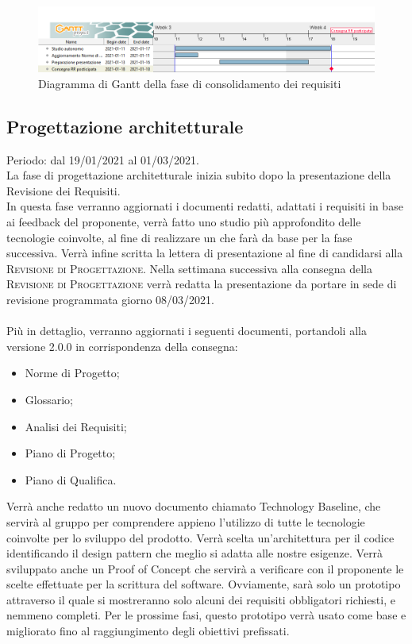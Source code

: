 \documentclass[../piano_di_progetto.tex]{subfiles}
\begin{document}
\begin{figure}[H]
\centering
\includegraphics[width=18cm]{img/gantt/01_RR_consolidamento.png}
\caption{ Diagramma di Gantt della fase di consolidamento dei requisiti}
\end{figure}

\subsection{Progettazione architetturale}%
\label{sub:prog_arc}
Periodo: dal 19/01/2021 al 01/03/2021.\\
La fase di progettazione architetturale inizia subito dopo la presentazione della Revisione dei Requisiti.\\
In questa fase verranno aggiornati i documenti redatti, adattati i requisiti in base ai feedback del proponente, verrà fatto uno studio più approfondito delle tecnologie coinvolte, al fine di realizzare un  che farà da base per la fase successiva. Verrà infine scritta la lettera di presentazione al fine di candidarsi alla \textsc{Revisione di Progettazione}. Nella settimana successiva alla consegna della \textsc{Revisione di Progettazione} verrà redatta la presentazione da portare in sede di revisione programmata giorno 08/03/2021. \\ \\

Più in dettaglio, verranno aggiornati i seguenti documenti, portandoli alla versione 2.0.0 in corrispondenza della consegna:

\begin{itemize}
    \item Norme di Progetto;
    \item Glossario;
    \item Analisi dei Requisiti;
    \item Piano di Progetto;
    \item Piano di Qualifica.
\end{itemize}

Verrà anche redatto un nuovo documento chiamato Technology Baseline, che servirà al gruppo per comprendere appieno l'utilizzo di tutte le tecnologie coinvolte per lo sviluppo del prodotto. Verrà scelta un'architettura per il codice identificando il design pattern che meglio si adatta alle nostre esigenze. Verrà sviluppato anche un Proof of Concept che servirà a verificare con il proponente le scelte effettuate per la scrittura del software. Ovviamente, sarà solo un prototipo attraverso il quale si mostreranno solo alcuni dei requisiti obbligatori richiesti, e nemmeno completi. Per le prossime fasi, questo prototipo verrà usato come base e migliorato fino al raggiungimento degli obiettivi prefissati.
\end{document}
